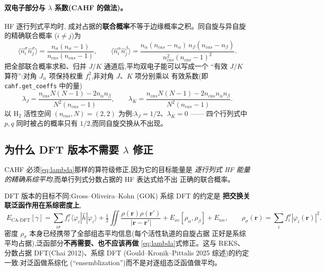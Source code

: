\documentclass[11pt,a4paper]{ctexart}
\begin{document}
\paragraph{双电子部分与 $\lambda$ 系数(CAHF 的做法)。}HF 逐行列式平均时,
成对占据的\textbf{联合概率}不等于边缘概率之积。同自旋与异自旋的精确联合概率
($i\neq j$)为
\begin{equation}
  \langle \hat n_i^\sigma \hat n_j^\sigma\rangle
    = \frac{n_\sigma(n_\sigma-1)}{n_{cas}(n_{cas}-1)},
  \qquad
  \langle \hat n_i^\alpha \hat n_j^\beta\rangle
    = \frac{n_\alpha(n_{cas}\!-\!n_\alpha)\, n_\beta(n_{cas}\!-\!n_\beta)}
           {n_{cas}^2 (n_{cas}-1)^2} .
\end{equation}
把全部联合概率求和、归并 $J/K$ 通道后,平均双电子能可以写成一个
``有效 $J/K$ 算符'':对角 $J_{ii}$ 项保持权重 $f_i^2$,非对角 $J$、$K$ 项分别乘以
有效系数(即 \texttt{cahf.get\_coeffs} 中的量)
\begin{equation}
  \lambda_J = \frac{n_{cas}N(N-1) - 2 n_\alpha n_\beta}{N^2 (n_{cas}-1)},
  \qquad
  \lambda_K = \frac{n_{cas}N(N-1) - 2 n_{cas} n_\alpha n_\beta}{N^2 (n_{cas}-1)} .
  \label{eq:lambda}
\end{equation}
以 H$_2$ 活性空间 $(n_{cas},N)=(2,2)$ 为例:$\lambda_J = 1/2$、$\lambda_K = 0$
—— 四个行列式中 $p,q$ 同时被占的概率只有 $1/2$,而同自旋交换从不出现。

\subsection{为什么 DFT 版本不需要 $\lambda$ 修正}\label{sec:nolambda}

CAHF 必须\eqref{eq:lambda}那样的算符级修正,因为它的目标能量是
\emph{逐行列式 HF 能量的精确系综平均},而单行列式分数占据的 HF 表达式给不出
正确的联合概率。

DFT 版本的目标不同:Gross--Oliveira--Kohn (GOK) 系综 DFT 的约定是
\textbf{把交换关联泛函作用在系综密度上},
\begin{equation}
  \boxed{\;
  E_{\mathrm{CA\text{-}DFT}}[\gamma]
  = \sum_{i\sigma} f_i^\sigma \langle \varphi_i | \hat h | \varphi_i\rangle
  + \tfrac12 \iint \frac{\rho(\bm r)\rho(\bm r')}{|\bm r-\bm r'|}
  + E_{xc}[\rho_\alpha, \rho_\beta] + E_{nn},
  \qquad
  \rho_\sigma(\bm r) = \sum_i f_i^\sigma |\varphi_i(\bm r)|^2 .
  \;}
  \label{eq:ecadft}
\end{equation}
密度 $\rho_\sigma$ 本身已经携带了全部组态平均信息(每个活性轨道的自旋占据
正好是系综平均占据),泛函部分\textbf{不再需要、也不应该再做}
\eqref{eq:lambda}式修正。这与 REKS、分数占据 DFT(Chai 2012)、系综 DFT
(Gould--Kronik--Pittalis 2025 综述)的约定一致:对泛函做系综化
(``ensemblization'')而不是对逐组态泛函值做平均。
\end{document}
